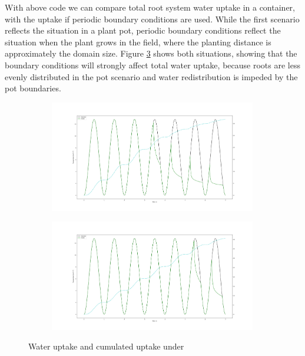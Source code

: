 With above code we can compare total root system water uptake in a container, with the uptake if periodic boundary conditions are used. While the first scenario reflects the situation in a plant pot, periodic boundary conditions reflect the situation when the plant grows in the field, where the planting distance is approximately the domain size. Figure \ref{fig:uptake} shows both situations, showing that the boundary conditions will strongly affect total water uptake, because roots are less evenly distributed in the pot scenario and water redistribution is impeded by the pot boundaries.

\begin{figure}
\begin{subfigure}[c]{1\textwidth} 
\includegraphics[width=0.99\textwidth]{Figure6c.png}
 \label{fig:uptake_confined}
\end{subfigure}
\begin{subfigure}[c]{1\textwidth}
\includegraphics[width=0.99\textwidth]{Figure6c_periodic.png}
 \label{fig:uptake_peridodic}
\end{subfigure}
\caption{Water uptake and cumulated uptake under} \label{fig:uptake}
\end{figure}



